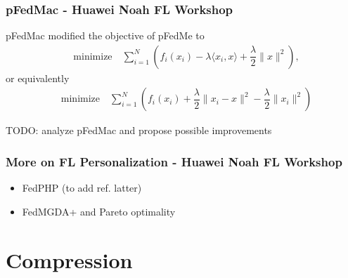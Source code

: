 \begin{frame}
\frametitle{pFedMac - Huawei Noah FL Workshop}

pFedMac\cite{li2021pfedmac} modified the objective of pFedMe to
\begin{align*}
    & \text{minimize} \quad \sum\limits_{i=1}^N \left( f_i(x_i) - \lambda\langle x_i, x \rangle + \dfrac{\lambda}{2} \lVert x \rVert^2 \right),
\end{align*}
or equivalently
\begin{align*}
    & \text{minimize} \quad \sum\limits_{i=1}^N \left( f_i(x_i) + \dfrac{\lambda}{2} \lVert x_i-x \rVert^2 - \dfrac{\lambda}{2} \lVert x_i \rVert^2 \right)
\end{align*}

{\color{red}TODO: analyze pFedMac and propose possible improvements}


\end{frame}


\begin{frame}
\frametitle{More on FL Personalization - Huawei Noah FL Workshop}

\begin{itemize}
    \item {\color{red} FedPHP (to add ref. latter)}
    \item {\color{red} FedMGDA+\cite{hu2020fedmgda+} and Pareto optimality}
\end{itemize}


\end{frame}


\section{Compression}


